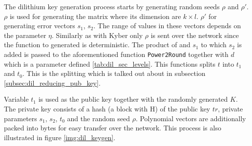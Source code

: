 The dilithium key generation process starts by generating random seeds $\rho$ and $\rho'$. $\rho$ is used for generating the matrix  where its dimension are $k\times l$. $\rho'$ for generating error vectors $s_1$, $s_2$. The range of values in these vectors depends on the parameter $\eta$. Similarly as with Kyber only $\rho$ is sent over the network since the function to generated  is deterministic. The product of  and $s_1$ to which $s_2$ is added is passed to the aforementioned function \texttt{Power2Round} together with $d$ which is a parameter defined \ref{tab:dil_sec_levels}. This functions splits $t$ into $t_1$ and $t_0$. This is the splitting which is talked out about in subsection \ref{subsec:dil_reducing_pub_key}.

Variable $t_1$ is used as the public key together with the randomly generated $K$. The private key consists of a hash (a block with H) of the public key $tr$, private parameters $s_1$, $s_2$, $t_0$ and the random seed $\rho$. Polynomial vectors are additionally packed into bytes for easy transfer over the network. This process is also illustrated in figure \ref{img:dil_keygen}.

